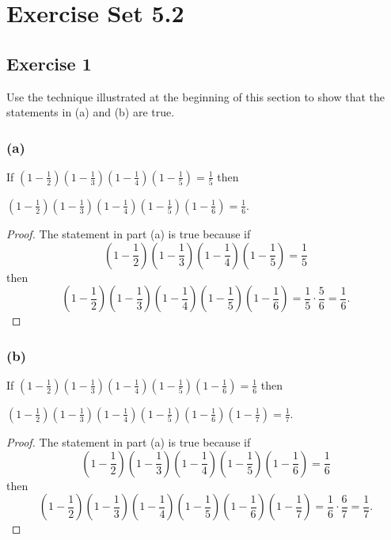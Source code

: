 \documentclass[14pt]{extarticle}
\newcommand{\dps}{\displaystyle}
\begin{document}
\section{Exercise Set 5.2}

\subsection{Exercise 1}
Use the technique illustrated at the beginning of this section to show that the statements in (a) and (b) are true.

\subsubsection{(a)}
If $\dps \left(1 - \frac{1}{2}\right)\left(1 - \frac{1}{3}\right)\left(1 - \frac{1}{4}\right)\left(1 - \frac{1}{5}\right) = \frac{1}{5}$ then 

$\dps \left(1 - \frac{1}{2}\right)\left(1 - \frac{1}{3}\right)\left(1 - \frac{1}{4}\right)\left(1 - \frac{1}{5}\right)\left(1 - \frac{1}{6}\right) = \frac{1}{6}$.

\begin{proof}
The statement in part (a) is true because if 
\[
\dps \left(1 - \frac{1}{2}\right)\left(1 - \frac{1}{3}\right)\left(1 - \frac{1}{4}\right)\left(1 - \frac{1}{5}\right) = \frac{1}{5}
\]
then
\[\dps \left(1 - \frac{1}{2}\right)\left(1 - \frac{1}{3}\right)\left(1 - \frac{1}{4}\right)\left(1 - \frac{1}{5}\right)\left(1 - \frac{1}{6}\right) = \frac{1}{5} \cdot \frac{5}{6} = \frac{1}{6}.
\]
\end{proof}

\subsubsection{(b)}
If $\dps \left(1 - \frac{1}{2}\right)\left(1 - \frac{1}{3}\right)\left(1 - \frac{1}{4}\right)\left(1 - \frac{1}{5}\right)\left(1 - \frac{1}{6}\right) = \frac{1}{6}$ then 

$\dps \left(1 - \frac{1}{2}\right)\left(1 - \frac{1}{3}\right)\left(1 - \frac{1}{4}\right)\left(1 - \frac{1}{5}\right)\left(1 - \frac{1}{6}\right)\left(1 - \frac{1}{7}\right) = \frac{1}{7}$.

\begin{proof}
The statement in part (a) is true because if 
\[
\dps \left(1 - \frac{1}{2}\right)\left(1 - \frac{1}{3}\right)\left(1 - \frac{1}{4}\right)\left(1 - \frac{1}{5}\right)\left(1 - \frac{1}{6}\right) = \frac{1}{6}
\]
then
\[\dps \left(1 - \frac{1}{2}\right)\left(1 - \frac{1}{3}\right)\left(1 - \frac{1}{4}\right)\left(1 - \frac{1}{5}\right)\left(1 - \frac{1}{6}\right)\left(1 - \frac{1}{7}\right) = \frac{1}{6} \cdot \frac{6}{7} = \frac{1}{7}.
\]
\end{proof}
\end{document}
